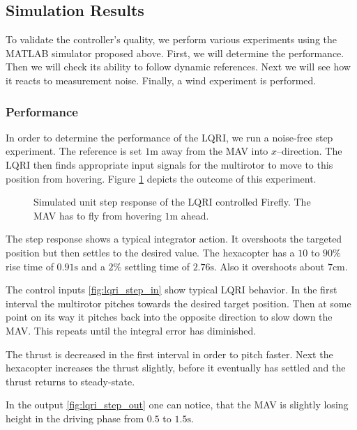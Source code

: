 \subsection{Simulation Results}
To validate the controller's quality, we perform various experiments using the MATLAB simulator proposed above. First, we will determine the performance. Then we will check its ability to follow dynamic references. Next we will see how it reacts to measurement noise. Finally, a wind experiment is performed.

\subsubsection{Performance}
In order to determine the performance of the LQRI, we run a noise-free step experiment. The reference is set $1 \si{\metre}$ away from the MAV into $x$--direction. The LQRI then finds appropriate input signals for the multirotor to move to this position from hovering. Figure \ref{fig:lqri_step} depicts the outcome of this experiment.
\begin{figure}
\centering
{}
\qquad
{}
\caption{Simulated unit step response of the LQRI controlled Firefly. The MAV has to fly from hovering $1\si{\metre}$ ahead.}
\label{fig:lqri_step}
\end{figure}

The step response shows a typical integrator action. It overshoots the targeted position but then settles to the desired value. The hexacopter has a $10$ to $90\si{\percent}$ rise time of $0.91 \si{\second}$ and a $2\si{\percent}$ settling time of $2.76 \si{\second}$. Also it overshoots about $7 \si{\centi\metre}$.

The control inputs \ref{fig:lqri_step_in} show typical LQRI behavior. In the first interval the multirotor pitches towards the desired target position. Then at some point on its way it pitches back into the opposite direction to slow down the MAV. This repeats until the integral error has diminished. 

The thrust is decreased in the first interval in order to pitch faster. Next the hexacopter increases the thrust slightly, before it eventually has settled and the thrust returns to steady-state.

In the output \ref{fig:lqri_step_out} one can notice, that the MAV is slightly losing height in the driving phase from $0.5$ to $1.5 \si{\second}$. %

